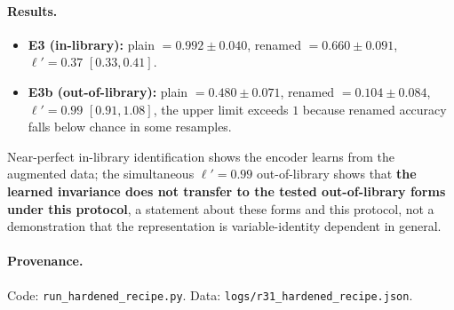 \paragraph{Results.}
\begin{itemize}[nosep]
\item \textbf{E3 (in-library):} plain $= 0.992 \pm 0.040$, renamed $= 0.660 \pm 0.091$, $\ell'{=}0.37$ $[0.33, 0.41]$.
\item \textbf{E3b (out-of-library):} plain $= 0.480 \pm 0.071$, renamed $= 0.104 \pm 0.084$, $\ell'{=}0.99$ $[0.91, 1.08]$, the upper limit exceeds $1$ because renamed accuracy falls below chance in some resamples.
\end{itemize}
Near-perfect in-library identification shows the encoder learns from the augmented data; the simultaneous $\ell'{=}0.99$ out-of-library shows that \textbf{the learned invariance does not transfer to the tested out-of-library forms under this protocol}, a statement about these forms and this protocol, not a demonstration that the representation is variable-identity dependent in general.

\paragraph{Provenance.} Code: \texttt{run\_hardened\_recipe.py}. Data: \texttt{logs/r31\_hardened\_recipe.json}.

